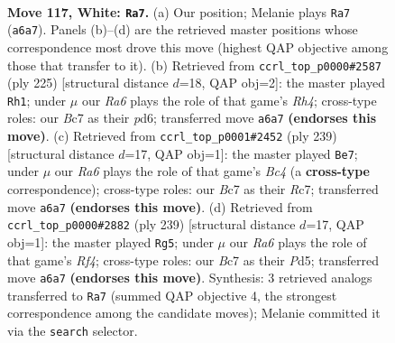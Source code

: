 \documentclass[11pt]{article}
\begin{document}
\clearpage

\begin{figure}[p]\centering
\begin{subfigure}{0.46\textwidth}\centering
\resizebox{\linewidth}{!}{%
\newchessgame
\chessboard[
  setfen={7r/2B4k/R7/P7/7K/8/8/8 w - - 3 117},
  showmover=false,
  pgfstyle=straightmove, color=movearrow, markmove={a6-a7}
]}
\caption{}
\end{subfigure}\hfill
\begin{subfigure}{0.46\textwidth}\centering
\resizebox{\linewidth}{!}{%
\newchessgame
\chessboard[
  setfen={8/6k1/3PR2p/7r/4K3/8/8/8 b - - 2 113},
  showmover=false,
  pgfstyle=straightmove, color=movearrow, markmove={h5-h1}
]}
\caption{}
\end{subfigure}
\\[4pt]
\begin{subfigure}{0.46\textwidth}\centering
\resizebox{\linewidth}{!}{%
\newchessgame
\chessboard[
  setfen={8/p1r5/2B4R/2b2k2/8/8/3K4/8 b - - 35 120},
  showmover=false,
  pgfstyle=straightmove, color=movearrow, markmove={c5-e7}
]}
\caption{}
\end{subfigure}\hfill
\begin{subfigure}{0.46\textwidth}\centering
\resizebox{\linewidth}{!}{%
\newchessgame
\chessboard[
  setfen={4R3/8/4P3/3p1r2/3k4/7K/8/8 b - - 0 120},
  showmover=false,
  pgfstyle=straightmove, color=movearrow, markmove={f5-g5}
]}
\caption{}
\end{subfigure}
\caption{\textbf{Move 117, White: \texttt{Ra7}.} (a) Our position; Melanie plays \texttt{Ra7} (\texttt{a6a7}). Panels (b)--(d) are the retrieved master positions whose correspondence most drove this move (highest QAP objective among those that transfer to it). (b) Retrieved from \texttt{ccrl\_top\_p0000\#2587} (ply 225) [structural distance $d$=18, QAP obj=2]: the master played \texttt{Rh1}; under $\mu$ our \emph{Ra6} plays the role of that game's \emph{Rh4}; cross-type roles: our \emph{B}c7 as their \emph{p}d6; transferred move \texttt{a6a7} \textbf{(endorses this move)}. (c) Retrieved from \texttt{ccrl\_top\_p0001\#2452} (ply 239) [structural distance $d$=17, QAP obj=1]: the master played \texttt{Be7}; under $\mu$ our \emph{Ra6} plays the role of that game's \emph{Bc4} (a \textbf{cross-type} correspondence); cross-type roles: our \emph{B}c7 as their \emph{R}c7; transferred move \texttt{a6a7} \textbf{(endorses this move)}. (d) Retrieved from \texttt{ccrl\_top\_p0000\#2882} (ply 239) [structural distance $d$=17, QAP obj=1]: the master played \texttt{Rg5}; under $\mu$ our \emph{Ra6} plays the role of that game's \emph{Rf4}; cross-type roles: our \emph{B}c7 as their \emph{P}d5; transferred move \texttt{a6a7} \textbf{(endorses this move)}. Synthesis: 3 retrieved analogs transferred to \texttt{Ra7} (summed QAP objective 4, the strongest correspondence among the candidate moves); Melanie committed it via the \texttt{search} selector.}
\label{fig:thought-m232}
\end{figure}
\end{document}
